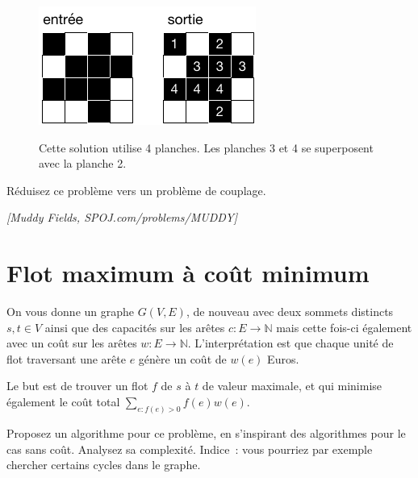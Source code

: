 \documentclass[12pt]{article}
\newcommand{\source}[1]{\begin{flushright}\emph{[#1]}\end{flushright}}
\begin{document}
\begin{figure}[h]
	\centerline{\includegraphics{boue.pdf}}
	Cette solution utilise 4 planches. Les planches 3 et 4 se superposent avec la planche 2.
\end{figure}

Réduisez ce problème vers un problème de couplage.

\source{Muddy Fields, SPOJ.com/problems/MUDDY}

\section{Flot maximum à coût minimum}

On vous donne un graphe $G(V,E)$, de nouveau avec deux sommets distincts $s,t\in V$ ainsi que des capacités sur les arêtes $c:E \rightarrow \mathbb N$ mais cette fois-ci également avec un coût sur les arêtes $w: E\rightarrow \mathbb N$.  L'interprétation est que chaque unité de flot traversant une arête $e$ génère un coût de $w(e)$ Euros.

Le but est de trouver un flot $f$ de $s$ à $t$ de valeur maximale, et qui minimise également le coût total $\sum_{e:f(e)>0} f(e) w(e)$.

Proposez un algorithme pour ce problème, en s'inspirant des algorithmes pour le cas sans coût.  Analysez sa complexité.
Indice~: vous pourriez par exemple chercher certains cycles dans le graphe.
\end{document}
